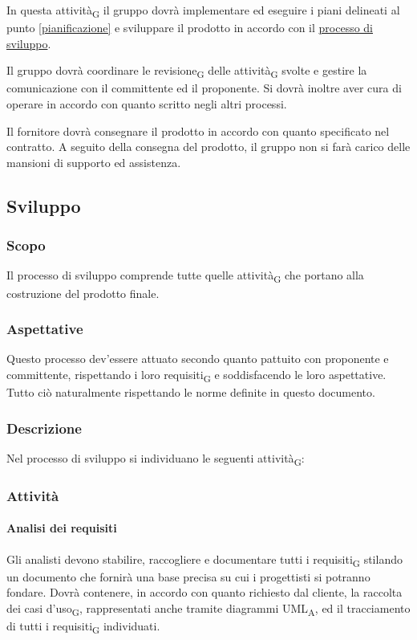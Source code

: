             In questa attività\textsubscript{G} il gruppo \group{} dovrà implementare ed eseguire i piani delineati al punto \ref{pianificazione} e sviluppare il prodotto in accordo con il \hyperref[sviluppo]{processo di sviluppo}.

            Il gruppo dovrà coordinare le revisione\textsubscript{G} delle attività\textsubscript{G} svolte e gestire la comunicazione con il committente ed il proponente. Si dovrà inoltre aver cura di operare in accordo con quanto scritto negli altri processi.


            Il fornitore dovrà consegnare il prodotto in accordo con quanto specificato nel contratto. A seguito della consegna del prodotto, il gruppo \group{}  non si farà carico delle mansioni di supporto ed assistenza.

\clearpage
\subsection{Sviluppo}
\label{sviluppo}
    \subsubsection{Scopo}
        Il processo di sviluppo comprende tutte quelle attività\textsubscript{G} che portano alla costruzione del prodotto finale.
    \subsubsection{Aspettative}
        Questo processo dev'essere attuato secondo quanto pattuito con proponente e committente, rispettando i loro requisiti\textsubscript{G} e soddisfacendo le loro aspettative. Tutto ciò naturalmente rispettando le norme definite in questo documento.
    \subsubsection{Descrizione}
        Nel processo di sviluppo si individuano  le seguenti attività\textsubscript{G}:

    \subsubsection{Attività}
        \paragraph{Analisi dei requisiti}
                Gli analisti devono stabilire, raccogliere e documentare tutti i requisiti\textsubscript{G} stilando un documento che fornirà una base precisa su cui i progettisti si potranno fondare. Dovrà contenere, in accordo con quanto richiesto dal cliente, la raccolta dei casi d'uso\textsubscript{G}, rappresentati anche tramite diagrammi UML\textsubscript{A}, ed il tracciamento di tutti i requisiti\textsubscript{G} individuati.

